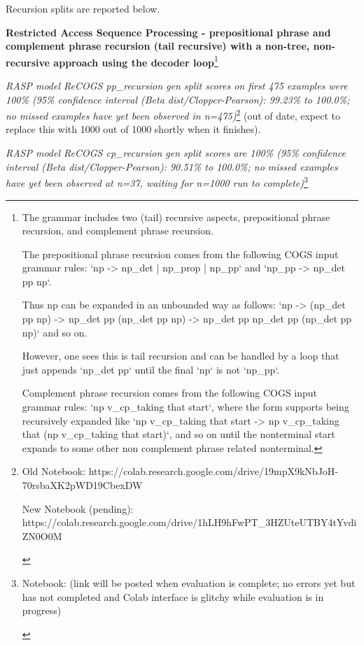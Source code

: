 \documentclass[11pt]{article}
\begin{document}
Recursion splits are reported below.

\textbf{Restricted Access Sequence Processing - prepositional phrase and complement phrase recursion (tail recursive) with a non-tree, non-recursive approach using the decoder loop}\footnote{
The grammar includes two (tail) recursive aspects, prepositional phrase recursion, and complement phrase recursion.

The prepositional phrase recursion comes from the following COGS input grammar rules: `np -> np\_det | np\_prop | np\_pp` and `np\_pp -> np\_det pp np`.

Thus np can be expanded in an unbounded way as follows: `np -> (np\_det pp np) -> np\_det pp (np\_det pp np) -> np\_det pp np\_det pp (np\_det pp np)` and so on.

However, one sees this is tail recursion and can be handled by a loop that just appends `np\_det pp` until the final `np` is not `np\_pp`.

Complement phrase recursion comes from the following COGS input grammar rules: `np v\_cp\_taking that start`, where the form supports being recursively expanded like `np v\_cp\_taking that start -> np v\_cp\_taking that (np v\_cp\_taking that start)`, and so on until the nonterminal start expands to some other non complement phrase related nonterminal.
}

\textit{RASP model ReCOGS pp\_recursion gen split scores on first 475 examples were 100\% (95\% confidence interval (Beta dist/Clopper-Pearson): 99.23\% to 100.0\%; no missed examples have yet been observed in n=475)}\footnote{
\begin{tiny}
Old Notebook: https://colab.research.google.com/drive/19mpX9kNbJoH-70rsbaXK2pWD19CbexDW 

New Notebook (pending): 
https://colab.research.google.com/drive/1hLH9hFwPT\_3HZUteUTBY4tYvdiZN0O0M
\end{tiny}
} (out of date, expect to replace this with 1000 out of 1000 shortly when it finishes).

\textit{RASP model ReCOGS cp\_recursion gen split scores are 100\% (95\% confidence interval (Beta dist/Clopper-Pearson): 90.51\% to 100.0\%; no missed examples have yet been observed at n=37, waiting for n=1000 run to complete)}\footnote{ 
\begin{tiny}
Notebook: (link will be posted when evaluation is complete; no errors yet but has not completed and Colab interface is glitchy while evaluation is in progress) 
\end{tiny}
}
\end{document}

